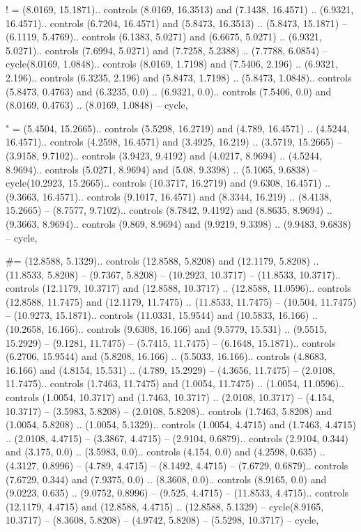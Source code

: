 ! = {(8.0169, 15.1871).. controls (8.0169, 16.3513) and (7.1438, 16.4571) .. (6.9321, 16.4571).. controls (6.7204, 16.4571) and (5.8473, 16.3513) .. (5.8473, 15.1871) -- (6.1119, 5.4769).. controls (6.1383, 5.0271) and (6.6675, 5.0271) .. (6.9321, 5.0271).. controls (7.6994, 5.0271) and (7.7258, 5.2388) .. (7.7788, 6.0854) -- cycle(8.0169, 1.0848).. controls (8.0169, 1.7198) and (7.5406, 2.196) .. (6.9321, 2.196).. controls (6.3235, 2.196) and (5.8473, 1.7198) .. (5.8473, 1.0848).. controls (5.8473, 0.4763) and (6.3235, 0.0) .. (6.9321, 0.0).. controls (7.5406, 0.0) and (8.0169, 0.4763) .. (8.0169, 1.0848) -- cycle},

" = {(5.4504, 15.2665).. controls (5.5298, 16.2719) and (4.789, 16.4571) .. (4.5244, 16.4571).. controls (4.2598, 16.4571) and (3.4925, 16.219) .. (3.5719, 15.2665) -- (3.9158, 9.7102).. controls (3.9423, 9.4192) and (4.0217, 8.9694) .. (4.5244, 8.9694).. controls (5.0271, 8.9694) and (5.08, 9.3398) .. (5.1065, 9.6838) -- cycle(10.2923, 15.2665).. controls (10.3717, 16.2719) and (9.6308, 16.4571) .. (9.3663, 16.4571).. controls (9.1017, 16.4571) and (8.3344, 16.219) .. (8.4138, 15.2665) -- (8.7577, 9.7102).. controls (8.7842, 9.4192) and (8.8635, 8.9694) .. (9.3663, 8.9694).. controls (9.869, 8.9694) and (9.9219, 9.3398) .. (9.9483, 9.6838) -- cycle},

\#= {(12.8588, 5.1329).. controls (12.8588, 5.8208) and (12.1179, 5.8208) .. (11.8533, 5.8208) -- (9.7367, 5.8208) -- (10.2923, 10.3717) -- (11.8533, 10.3717).. controls (12.1179, 10.3717) and (12.8588, 10.3717) .. (12.8588, 11.0596).. controls (12.8588, 11.7475) and (12.1179, 11.7475) .. (11.8533, 11.7475) -- (10.504, 11.7475) -- (10.9273, 15.1871).. controls (11.0331, 15.9544) and (10.5833, 16.166) .. (10.2658, 16.166).. controls (9.6308, 16.166) and (9.5779, 15.531) .. (9.5515, 15.2929) -- (9.1281, 11.7475) -- (5.7415, 11.7475) -- (6.1648, 15.1871).. controls (6.2706, 15.9544) and (5.8208, 16.166) .. (5.5033, 16.166).. controls (4.8683, 16.166) and (4.8154, 15.531) .. (4.789, 15.2929) -- (4.3656, 11.7475) -- (2.0108, 11.7475).. controls (1.7463, 11.7475) and (1.0054, 11.7475) .. (1.0054, 11.0596).. controls (1.0054, 10.3717) and (1.7463, 10.3717) .. (2.0108, 10.3717) -- (4.154, 10.3717) -- (3.5983, 5.8208) -- (2.0108, 5.8208).. controls (1.7463, 5.8208) and (1.0054, 5.8208) .. (1.0054, 5.1329).. controls (1.0054, 4.4715) and (1.7463, 4.4715) .. (2.0108, 4.4715) -- (3.3867, 4.4715) -- (2.9104, 0.6879).. controls (2.9104, 0.344) and (3.175, 0.0) .. (3.5983, 0.0).. controls (4.154, 0.0) and (4.2598, 0.635) .. (4.3127, 0.8996) -- (4.789, 4.4715) -- (8.1492, 4.4715) -- (7.6729, 0.6879).. controls (7.6729, 0.344) and (7.9375, 0.0) .. (8.3608, 0.0).. controls (8.9165, 0.0) and (9.0223, 0.635) .. (9.0752, 0.8996) -- (9.525, 4.4715) -- (11.8533, 4.4715).. controls (12.1179, 4.4715) and (12.8588, 4.4715) .. (12.8588, 5.1329) -- cycle(8.9165, 10.3717) -- (8.3608, 5.8208) -- (4.9742, 5.8208) -- (5.5298, 10.3717) -- cycle},

